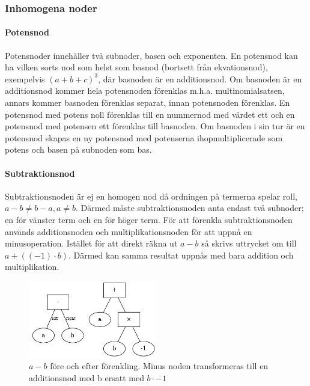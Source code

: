 \documentclass[12pt,a4paper]{article}
\begin{document}
\subsubsection{Inhomogena noder}
\paragraph{Potensnod}
\label{subsubsec:potensnod}
Potensnoder innehåller två subnoder, basen och exponenten. En potensnod kan ha vilken sorts nod som helst som basnod (bortsett från ekvationsnod), exempelvis \((a+b+c)^{3}\), där basnoden är en additionsnod. Om basnoden är en additionsnod kommer hela potensnoden förenklas m.h.a. multinomialsatsen, annars kommer basnoden förenklas separat, innan potensnoden förenklas. En potensnod med potens noll förenklas till en nummernod med värdet ett och en potensnod med potensen ett förenklas till basnoden. Om basnoden i sin tur är en potensnod skapas en ny potensnod med potenserna ihopmultiplicerade som potens och basen på subnoden som bas.
\paragraph{Subtraktionsnod}
Subtraktionsnoden är ej en homogen nod då ordningen på termerna spelar roll, \(a-b\neq b-a, a \neq b\). Därmed måste subtraktionsnoden anta endast två subnoder; en för vänster term och en för höger term. För att förenkla subtraktionsnoden används additionsnoden och multiplikationsnoden för att uppnå en minusoperation. Istället för att direkt räkna ut \(a-b\) så skrivs uttrycket om till \(a+((-1)\cdot b)\). Därmed kan samma resultat uppnås med bara addition och multiplikation.
\begin{figure}[h!]
  \centering
  \includegraphics[width=0.5\textwidth]{image-merged3.png}
  \caption{\(a-b\) före och efter förenkling. Minus noden transformeras till en additionsnod med b ersatt med \(b \cdot -1\)}
\end{figure}
\end{document}
